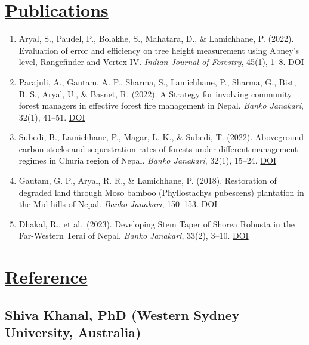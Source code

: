 \documentclass[
]{article}
\providecommand{\tightlist}{%
  \setlength{\itemsep}{0pt}\setlength{\parskip}{0pt}}
\begin{document}
\section{\texorpdfstring{\underline{Publications}}{}}\label{section-8}

\begin{enumerate}
\def\labelenumi{\arabic{enumi}.}
\tightlist
\item
  Aryal, S., Paudel, P., Bolakhe, S., Mahatara, D., \& Lamichhane, P.
  (2022). Evaluation of error and efficiency on tree height measurement
  using Abney's level, Rangefinder and Vertex IV. \emph{Indian Journal
  of Forestry}, 45(1), 1--8.
  \href{https://doi.org/10.54207/bsmps1000-2022-49P4F8}{DOI}
\item
  Parajuli, A., Gautam, A. P., Sharma, S., Lamichhane, P., Sharma, G.,
  Bist, B. S., Aryal, U., \& Basnet, R. (2022). A Strategy for involving
  community forest managers in effective forest fire management in
  Nepal. \emph{Banko Janakari}, 32(1), 41--51.
  \href{https://doi.org/10.3126/banko.v32i1.45476}{DOI}
\item
  Subedi, B., Lamichhane, P., Magar, L. K., \& Subedi, T. (2022).
  Aboveground carbon stocks and sequestration rates of forests under
  different management regimes in Churia region of Nepal. \emph{Banko
  Janakari}, 32(1), 15--24.
  \href{https://doi.org/10.3126/banko.v32i1.45442}{DOI}
\item
  Gautam, G. P., Aryal, R. R., \& Lamichhane, P. (2018). Restoration of
  degraded land through Moso bamboo (Phyllostachys pubescens) plantation
  in the Mid-hills of Nepal. \emph{Banko Janakari}, 150--153.
  \href{https://doi.org/10.3126/banko.v27i3.20560}{DOI}
\item
  Dhakal, R., et al.~(2023). Developing Stem Taper of Shorea Robusta in
  the Far-Western Terai of Nepal. \emph{Banko Janakari}, 33(2), 3--10.
  \href{https://doi.org/10.3126/banko.v33i2.58809}{DOI}
\end{enumerate}

\section{\texorpdfstring{\underline{Reference}}{}}\label{section-9}

\subsection{Shiva Khanal, PhD (Western Sydney University,
Australia)}\label{shiva-khanal-phd-western-sydney-university-australia}
\end{document}
